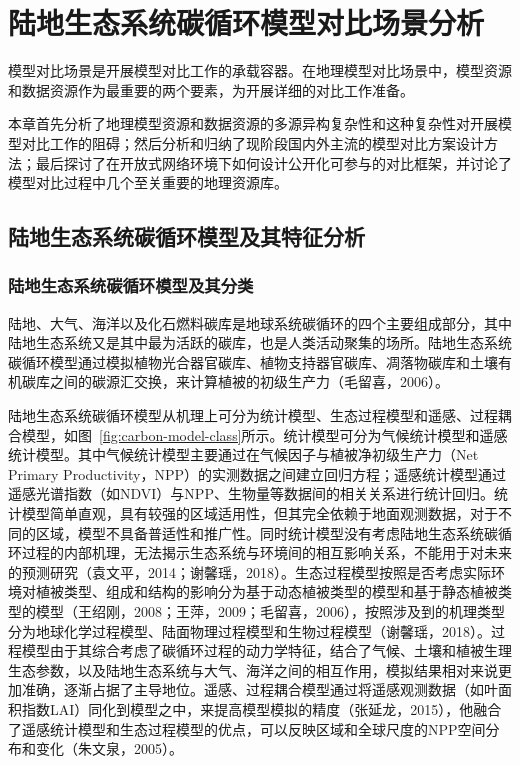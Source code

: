 \chapter{陆地生态系统碳循环模型对比场景分析}


模型对比场景是开展模型对比工作的承载容器。在地理模型对比场景中，模型资源和数据资源作为最重要的两个要素，为开展详细的对比工作准备。

本章首先分析了地理模型资源和数据资源的多源异构复杂性和这种复杂性对开展模型对比工作的阻碍；然后分析和归纳了现阶段国内外主流的模型对比方案设计方法；最后探讨了在开放式网络环境下如何设计公开化可参与的对比框架，并讨论了模型对比过程中几个至关重要的地理资源库。

\section{陆地生态系统碳循环模型及其特征分析}
\subsection{陆地生态系统碳循环模型及其分类}
陆地、大气、海洋以及化石燃料碳库是地球系统碳循环的四个主要组成部分，其中陆地生态系统又是其中最为活跃的碳库，也是人类活动聚集的场所。陆地生态系统碳循环模型通过模拟植物光合器官碳库、植物支持器官碳库、凋落物碳库和土壤有机碳库之间的碳源汇交换，来计算植被的初级生产力（毛留喜，2006）。

陆地生态系统碳循环模型从机理上可分为统计模型、生态过程模型和遥感、过程耦合模型，如图~\ref{fig:carbon-model-class}所示。统计模型可分为气候统计模型和遥感统计模型。其中气候统计模型主要通过在气候因子与植被净初级生产力（Net Primary Productivity，NPP）的实测数据之间建立回归方程；遥感统计模型通过遥感光谱指数（如NDVI）与NPP、生物量等数据间的相关关系进行统计回归。统计模型简单直观，具有较强的区域适用性，但其完全依赖于地面观测数据，对于不同的区域，模型不具备普适性和推广性。同时统计模型没有考虑陆地生态系统碳循环过程的内部机理，无法揭示生态系统与环境间的相互影响关系，不能用于对未来的预测研究（袁文平，2014；谢馨瑶，2018）。生态过程模型按照是否考虑实际环境对植被类型、组成和结构的影响分为基于动态植被类型的模型和基于静态植被类型的模型（王绍刚，2008；王萍，2009；毛留喜，2006），按照涉及到的机理类型分为地球化学过程模型、陆面物理过程模型和生物过程模型（谢馨瑶，2018）。过程模型由于其综合考虑了碳循环过程的动力学特征，结合了气候、土壤和植被生理生态参数，以及陆地生态系统与大气、海洋之间的相互作用，模拟结果相对来说更加准确，逐渐占据了主导地位。遥感、过程耦合模型通过将遥感观测数据（如叶面积指数LAI）同化到模型之中，来提高模型模拟的精度（张延龙，2015），他融合了遥感统计模型和生态过程模型的优点，可以反映区域和全球尺度的NPP空间分布和变化（朱文泉，2005）。

